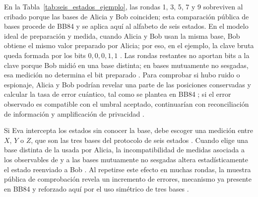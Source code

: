En la Tabla~\ref{tab:seis_estados_ejemplo}, las rondas 1, 3, 5, 7 y 9 sobreviven al cribado porque las bases de Alicia y Bob coinciden; esta comparación pública de bases procede de BB84 y se aplica aquí al alfabeto de seis estados. En el modelo ideal de preparación y medida, cuando Alicia y Bob usan la misma base, Bob obtiene el mismo valor preparado por Alicia; por eso, en el ejemplo, la clave bruta queda formada por los bits $0,0,0,1,1$ \citep{bennett1984,bruss1998}. Las rondas restantes no aportan bits a la clave porque Bob midió en una base distinta; en bases mutuamente no sesgadas, esa medición no determina el bit preparado \citep{schwinger1960}. Para comprobar si hubo ruido o espionaje, Alicia y Bob podrían revelar una parte de las posiciones conservadas y calcular la tasa de error cuántico, tal como se plantea en BB84 \citep{bennett1984}; si el error observado es compatible con el umbral aceptado, continuarían con reconciliación de información y amplificación de privacidad \citep{brassard1994,bennett1995}.

Si Eva intercepta los estados sin conocer la base, debe escoger una medición entre $X$, $Y$ o $Z$, que son las tres bases del protocolo de seis estados \citep{bruss1998}. Cuando elige una base distinta de la usada por Alicia, la incompatibilidad de medidas asociada a los observables de \cite{pauli1927} y a las bases mutuamente no sesgadas altera estadísticamente el estado reenviado a Bob \citep{schwinger1960}. Al repetirse este efecto en muchas rondas, la muestra pública de comprobación revela un incremento de errores, mecanismo ya presente en BB84 y reforzado aquí por el uso simétrico de tres bases \citep{bennett1984,bruss1998}.
